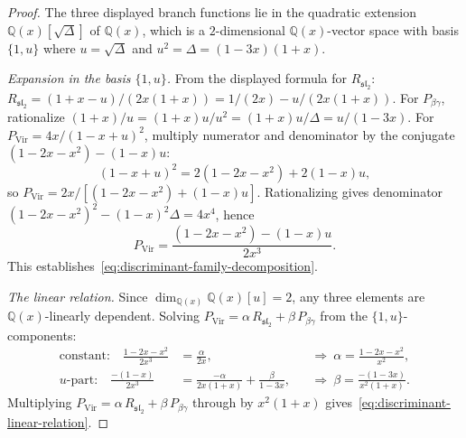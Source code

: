 \begin{proof}
The three displayed branch functions
lie in the quadratic extension
$\mathbb{Q}(x)[\sqrt{\Delta}]$ of $\mathbb{Q}(x)$,
which is a $2$-dimensional $\mathbb{Q}(x)$-vector space with basis
$\{1, u\}$ where $u = \sqrt{\Delta}$ and $u^2 = \Delta = (1{-}3x)(1{+}x)$.

\emph{Expansion in the basis $\{1, u\}$.}
From the displayed formula for $R_{\mathfrak{sl}_2}$:
$R_{\mathfrak{sl}_2} = (1{+}x{-}u)/(2x(1{+}x)) = 1/(2x) - u/(2x(1{+}x))$.
For $P_{\beta\gamma}$, rationalize $(1{+}x)/u = (1{+}x)u/u^2 = (1{+}x)u/\Delta = u/(1{-}3x)$.
For $P_{\mathrm{Vir}} = 4x/(1{-}x{+}u)^2$,
multiply numerator and denominator by the conjugate
$(1{-}2x{-}x^2) - (1{-}x)u$:
\[
(1{-}x{+}u)^2 = 2(1{-}2x{-}x^2) + 2(1{-}x)u,
\]
so $P_{\mathrm{Vir}} = 2x/[(1{-}2x{-}x^2)+(1{-}x)u]$.
Rationalizing gives denominator
$(1{-}2x{-}x^2)^2 - (1{-}x)^2\Delta = 4x^4$, hence
\[
P_{\mathrm{Vir}} = \frac{(1{-}2x{-}x^2)-(1{-}x)u}{2x^3}.
\]
This establishes~\eqref{eq:discriminant-family-decomposition}.

\emph{The linear relation.}
Since $\dim_{\mathbb{Q}(x)} \mathbb{Q}(x)[u] = 2$,
any three elements are $\mathbb{Q}(x)$-linearly dependent.
Solving $P_{\mathrm{Vir}} = \alpha\, R_{\mathfrak{sl}_2} + \beta\, P_{\beta\gamma}$
from the $\{1,u\}$-components:
\begin{align*}
\text{constant:} \quad
 \frac{1{-}2x{-}x^2}{2x^3} &= \frac{\alpha}{2x},
 &&\Rightarrow\ \alpha = \frac{1{-}2x{-}x^2}{x^2}, \\
\text{$u$-part:} \quad
 \frac{-(1{-}x)}{2x^3} &= \frac{-\alpha}{2x(1{+}x)} + \frac{\beta}{1{-}3x},
 &&\Rightarrow\ \beta = \frac{-(1{-}3x)}{x^2(1{+}x)}.
\end{align*}
Multiplying $P_{\mathrm{Vir}} = \alpha\, R_{\mathfrak{sl}_2} + \beta\, P_{\beta\gamma}$
through by $x^2(1{+}x)$ gives~\eqref{eq:discriminant-linear-relation}.
\end{proof}

